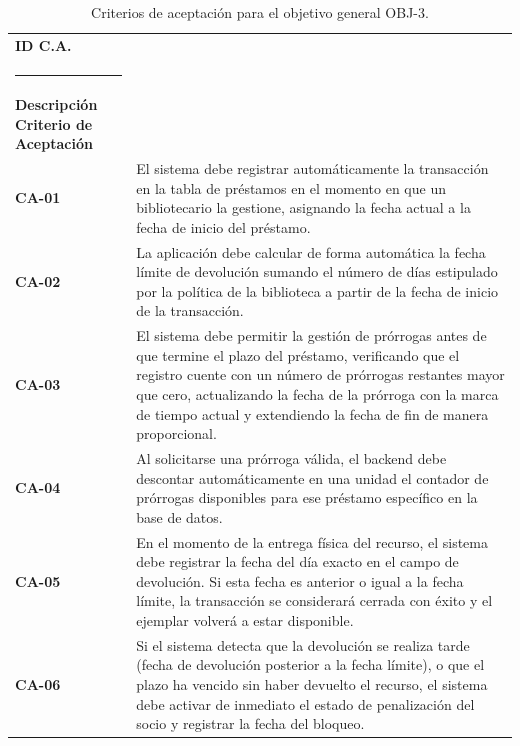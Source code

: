 \begin{table}[H]
	\centering
	\caption{Criterios de aceptación para el objetivo general OBJ-3.}
	\label{tab:criterios_aceptacion_normal03}
	\begin{tabularx}{\textwidth}{l X}
		\toprule
		\textbf{ID C.A.} & 
		\begin{minipage}[t]{\linewidth}
			\textbf{ID Objetivo asociado: OBJ-3 <Automatización del ciclo de vida de los préstamos>} \\[2pt]
			\rule{\linewidth}{0.4pt} \\[2pt]
			\textbf{Descripción Criterio de Aceptación}
		\end{minipage} \\
		\midrule
		\textbf{CA-01} & El sistema debe registrar automáticamente la transacción en la tabla de préstamos en el momento en que un bibliotecario la gestione, asignando la fecha actual a la fecha de inicio del préstamo. \\
		\addlinespace
		\textbf{CA-02} & La aplicación debe calcular de forma automática la fecha límite de devolución sumando el número de días estipulado por la política de la biblioteca a partir de la fecha de inicio de la transacción. \\
		\addlinespace
		\textbf{CA-03} & El sistema debe permitir la gestión de prórrogas antes de que termine el plazo del préstamo, verificando que el registro cuente con un número de prórrogas restantes mayor que cero, actualizando la fecha de la prórroga con la marca de tiempo actual y extendiendo la fecha de fin de manera proporcional. \\
		\addlinespace
		\textbf{CA-04} & Al solicitarse una prórroga válida, el backend debe descontar automáticamente en una unidad el contador de prórrogas disponibles para ese préstamo específico en la base de datos. \\
		\addlinespace
		\textbf{CA-05} & En el momento de la entrega física del recurso, el sistema debe registrar la fecha del día exacto en el campo de devolución. Si esta fecha es anterior o igual a la fecha límite, la transacción se considerará cerrada con éxito y el ejemplar volverá a estar disponible. \\
		\addlinespace
		\textbf{CA-06} & Si el sistema detecta que la devolución se realiza tarde (fecha de devolución posterior a la fecha límite), o que el plazo ha vencido sin haber devuelto el recurso, el sistema debe activar de inmediato el estado de penalización del socio y registrar la fecha del bloqueo. \\
		\bottomrule
	\end{tabularx}	
\end{table}

